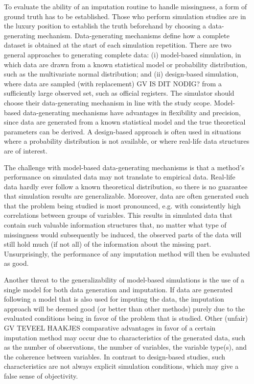 \documentclass[bimj,fleqn]{w-art}
\begin{document}
To evaluate the ability of an imputation routine to handle missingness, a form of ground  truth has to be established. Those who perform simulation studies are in the luxury position to establish the truth beforehand by choosing a data-generating mechanism. Data-generating mechanisms define how a complete dataset is obtained at the start of each simulation repetition. There are two general approaches to generating complete data: (i) model-based simulation, in which data are drawn from a known statistical model or probability distribution, such as the multivariate normal distribution; and (ii) design-based simulation, where data are sampled (with replacement) GV IS DIT NODIG? from a sufficiently large observed set, such as official registers. The simulator should choose their data-generating mechanism in line with the study scope. Model-based data-generating mechanisms have advantages in flexibility and precision, since data are generated from a known statistical model and the true theoretical parameters can be derived. A design-based approach is often used in situations where a probability distribution is not available, or where real-life data structures are of interest.

The challenge with model-based data-generating mechanisms is that a method's performance on simulated data may not translate to empirical data. Real-life data hardly ever follow a known theoretical distribution, so there is no guarantee that simulation results are generalizable. Moreover, data are often generated such that the problem being studied is most pronounced, e.g. with consistently high correlations between groups of variables. This results in simulated data that contain such valuable information structures that, no matter what type of missingness would subsequently be induced, the observed parts of the data will still hold much (if not all) of the information about the missing part. Unsurprisingly, the performance of any imputation method will then be evaluated as good.

Another threat to the generalizability of model-based simulations is the use of a single model for both data generation and imputation. If data are generated following a model that is also used for imputing the data, the imputation approach will be deemed good (or better than other methods) purely due to the evaluated conditions being in favor of the problem that is studied. Other (unfair) GV TEVEEL HAAKJES comparative advantages in favor of a certain imputation method may occur due to characteristics of the generated data, such as the number of observations, the number of variables, the variable type(s), and the coherence between variables. In contrast to design-based studies, such characteristics are not always explicit simulation conditions, which may give a false sense of objectivity.
\end{document}
